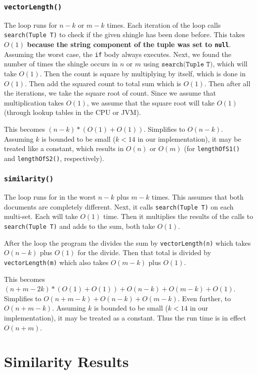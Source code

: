 \documentclass[10pt,letterpaper]{article}
\begin{document}
\subsubsection{\texttt{vectorLength()}}
The loop runs for $n-k$ or $m-k$ times. Each iteration of the loop calls \texttt{search(Tuple T)} to check if the given shingle has been done before. This takes $O(1)$ \textbf{because the string component of the tuple was set to \texttt{null}}. Assuming the worst case, the \texttt{if} body always executes. Next, we found the number of times the shingle occurs in $n$ or $m$ using $ \texttt{search(Tuple T)}$, which will take $O(1)$. Then the count is square by multiplying by itself, which is done in $O(1)$. Then add the squared count to total sum which is $O(1)$. Then after all the iterations, we take the square root of count. Since we assume that multiplication takes $O(1)$, we assume that the square root will take $O(1)$ (through lookup tables in the CPU or JVM).

This becomes $(n-k)*(O(1)+O(1))$. Simplifies to $O(n-k)$. Assuming $k$ is bounded to be small ($k<14$ in our implementation), it may be treated like a constant, which results in $O(n)$ or $O(m)$ (for \texttt{lengthOfS1()} and \texttt{lengthOfS2()}, respectively).
\subsubsection{\texttt{similarity()}}
The loop runs for in the worst $n-k$ plus $m-k$ times. This assumes that both documents are completely different. Next, it calls \texttt{search(Tuple T)} on each multi-set. Each will take $O(1)$ time. Then it multiplies the results of the calls to \texttt{search(Tuple T)} and adds to the sum, both take $O(1)$.

After the loop the program the divides the sum by \texttt{vectorLength(n)} which takes $O(n-k)$ plus $O(1)$ for the divide. Then that total is divided by \texttt{vectorLength(m)} which also takes $O(m-k)$ plus $O(1)$.

This becomes $(n+m-2k)*(O(1)+O(1))+O(n-k)+O(m-k)+O(1)$. Simplifies to $O(n+m-k)+O(n-k)+O(m-k)$. Even further, to $O(n+m-k)$. Assuming $k$ is bounded to be small ($k<14$ in our implementation), it may be treated as a constant. Thus the run time is in effect $O(n+m)$.
\section{Similarity Results}
\end{document}
